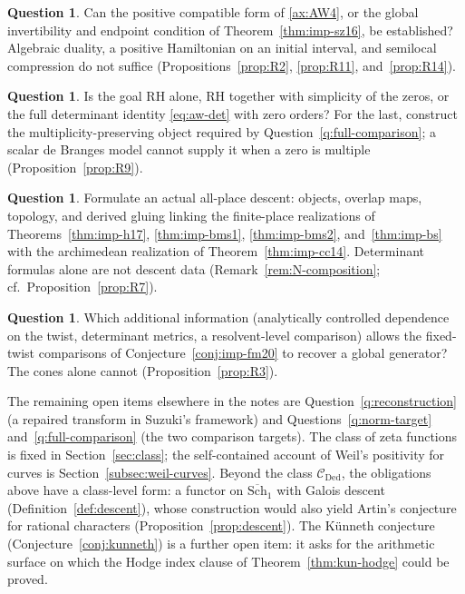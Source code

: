 \documentclass[11pt]{amsart}
\theoremstyle{plain}
\theoremstyle{definition}
\newtheorem{question}[theorem]{Question}
\theoremstyle{remark}
\numberwithin{equation}{section}
\newcommand{\cC}{\mathcal{C}}
\newcommand{\Schbar}{\overline{\mathrm{Sch}}}
\begin{document}
\begin{question}\label{q:obl-positivity}
Can the positive compatible form of \ref{ax:AW4}, or the global
invertibility and endpoint condition of Theorem~\ref{thm:imp-sz16}, be
established? Algebraic duality, a positive Hamiltonian on an initial
interval, and semilocal compression do not suffice
(Propositions~\ref{prop:R2}, \ref{prop:R11}, and~\ref{prop:R14}).
\end{question}

\begin{question}\label{q:obl-multiplicity}
Is the goal RH alone, RH together with simplicity of the zeros, or the
full determinant identity \eqref{eq:aw-det} with zero orders? For the
last, construct the multiplicity-preserving object required by
Question~\ref{q:full-comparison}; a scalar de Branges model cannot
supply it when a zero is multiple (Proposition~\ref{prop:R9}).
\end{question}

\begin{question}\label{q:obl-descent}
Formulate an actual all-place descent: objects, overlap maps, topology,
and derived gluing linking the finite-place realizations of
Theorems~\ref{thm:imp-h17}, \ref{thm:imp-bms1}, \ref{thm:imp-bms2},
and~\ref{thm:imp-bs} with the archimedean realization of
Theorem~\ref{thm:imp-cc14}. Determinant formulas alone are not descent
data (Remark~\ref{rem:N-composition}; cf.\
Proposition~\ref{prop:R7}).
\end{question}

\begin{question}\label{q:obl-special-values}
Which additional information (analytically controlled dependence on the
twist, determinant metrics, a resolvent-level comparison) allows the
fixed-twist comparisons of Conjecture~\ref{conj:imp-fm20} to recover a
global generator? The cones alone cannot (Proposition~\ref{prop:R3}).
\end{question}

The remaining open items elsewhere in the notes are
Question~\ref{q:reconstruction} (a repaired transform in
Suzuki's framework) and Questions~\ref{q:norm-target}
and~\ref{q:full-comparison} (the two comparison targets). The class of
zeta functions is fixed in
Section~\ref{sec:class}; the self-contained account of Weil's positivity
for curves is Section~\ref{subsec:weil-curves}. Beyond the class
$\cC_{\mathrm{Ded}}$, the obligations above have a class-level form: a
functor on $\Schbar_1$ with Galois descent (Definition~\ref{def:descent}),
whose construction would also yield Artin's conjecture for rational
characters (Proposition~\ref{prop:descent}).
The K\"unneth conjecture (Conjecture~\ref{conj:kunneth}) is a further
open item: it asks for the arithmetic surface on which the Hodge index
clause of Theorem~\ref{thm:kun-hodge} could be proved.
\end{document}
